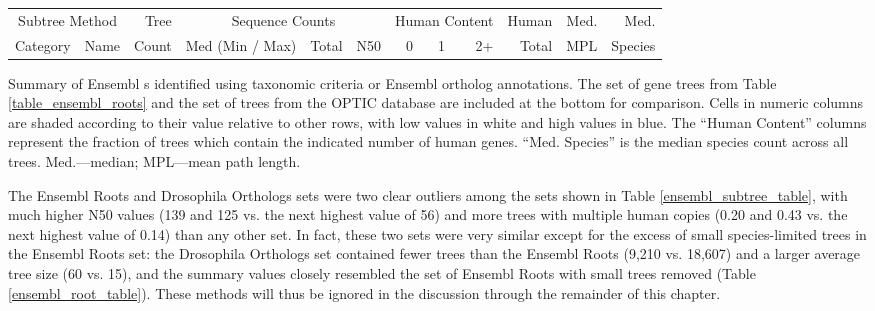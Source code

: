 \bbtable
\centering \footnotesize
\begin{tabular}{llrb{2.5cm}rrrrrrrr}
\toprule

\multicolumn{2}{c}{Subtree Method} & Tree & \multicolumn{3}{c}{Sequence Counts} & \multicolumn{3}{c}{Human Content} & Human & Med. & Med. \\ 
\cmidrule(r){1-2} \cmidrule(r){4-6} \cmidrule(r){7-9}
Category & Name & Count  & \scriptsize{Med (Min / Max)} & Total & N50 & 0 & 1 & 2+ & Total & MPL & Species \\ 

  \midrule

\bottomrule
\end{tabular}
\caption{Summary of Ensembl \subtr{}s identified using taxonomic
  criteria or Ensembl ortholog annotations. The set of \cmp gene trees
  from Table \ref{table_ensembl_roots} and the set of trees from the
  OPTIC database \citep{Heger2008} are included at the bottom for
  comparison. Cells in numeric columns are shaded according to their
  value relative to other rows, with low values in white and high
  values in blue. The ``Human Content'' columns represent the fraction
  of trees which contain the indicated number of human
  genes. ``Med. Species'' is the median species count across all
  trees. Med.---median; MPL---mean path length.}
\label{ensembl_subtree_table}
\eetable


The Ensembl Roots and Drosophila Orthologs sets were two clear
outliers among the \subtr sets shown in Table
\ref{ensembl_subtree_table}, with much higher N50 values (139 and 125
vs. the next highest value of 56) and more trees with multiple human
copies (0.20 and 0.43 vs. the next highest value of 0.14) than any
other \subtr set. In fact, these two \subtr sets were very similar
except for the excess of small species-limited trees in the Ensembl
Roots set: the Drosophila Orthologs set contained fewer trees than the
Ensembl Roots (9,210 vs. 18,607) and a larger average tree size (60
vs. 15), and the summary values closely resembled the set of Ensembl
Roots with small trees removed (Table \ref{ensembl_root_table}). These
methods will thus be ignored in the discussion through the remainder
of this chapter.

